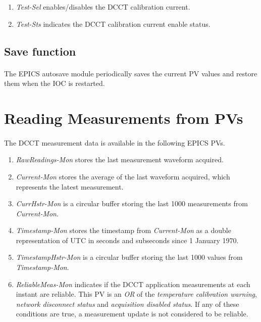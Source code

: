 \documentclass[openany]{article}
\begin{document}
			\begin{enumerate}
				\item \emph{Test-Sel} enables/disables the DCCT calibration current.
				\item \emph{Test-Sts} indicates the DCCT calibration current enable status.
			\end{enumerate}

	\subsection{Save function}

		\paragraph{} The EPICS autosave module periodically saves the current PV values and restore them when the IOC is restarted.

\section{Reading Measurements from PVs}

	\paragraph{} The DCCT measurement data is available in the following EPICS PVs.

		\begin{enumerate}
			\item \emph{RawReadings-Mon} stores the last measurement waveform acquired.
			\item \emph{Current-Mon} stores the average of the last waveform acquired, which represents the latest measurement.
			\item \emph{CurrHstr-Mon} is a circular buffer storing the last 1000 measurements from \emph{Current-Mon}.
			\item \emph{Timestamp-Mon} stores the timestamp from \emph{Current-Mon} as a double representation of UTC in seconds and subseconds since 1 January 1970.
			\item \emph{TimestampHstr-Mon} is a circular buffer storing the last 1000 values from \emph{Timestamp-Mon}.
			\item \emph{ReliableMeas-Mon} indicates if the DCCT application measurements at each instant are reliable. This PV is an \emph{OR} of the \emph{temperature calibration warning}, \emph{network disconnect status} and \emph{acquisition disabled status}. If any of these conditions are true, a measurement update is not considered to be reliable.
		\end{enumerate}
\end{document}
